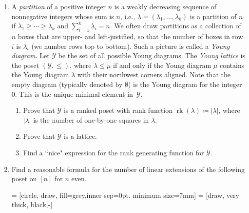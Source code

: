\documentclass[11pt]{article}%
\theoremstyle{definition}
\DeclareMathOperator{\rk}{rk}
\begin{document}
\begin{enumerate}

\item A \emph{partition} of a positive integer $n$ is a weakly decreasing sequence of nonnegative integers whose sum is $n$, i.e., $\lambda = (\lambda_1,\ldots,\lambda_k)$ is a partition of $n$ if $\lambda_1\geq\cdots\geq \lambda_k$ and $\sum_{i=1}^k \lambda_i = n$. We often draw partitions as a collection of $n$ boxes that are upper- and left-justified, so that the number of boxes in row $i$ is $\lambda_i$ (we number rows top to bottom). Such a picture is called a \emph{Young diagram}. Let $\mathcal{Y}$ be the set of all possible Young diagrams. The \emph{Young lattice} is the poset $(\mathcal{Y},\leq)$, where $\lambda\leq \mu$ if and only if the Young diagram $\mu$ contains the Young diagram $\lambda$ with their northwest corners aligned. Note that the empty diagram (typically denoted by $\emptyset$) is the Young diagram for the integer 0. This is the unique minimal element in~$\mathcal{Y}$.
\begin{enumerate}
\item Prove that $\mathcal{Y}$ is a ranked poset with rank function $\rk(\lambda)\coloneqq |\lambda|$, where $|\lambda|$ is the number of one-by-one squares in $\lambda$.
\item Prove that $\mathcal{Y}$ is a lattice.
\item Find a ``nice" expression for the rank generating function for $\mathcal{Y}$.
\end{enumerate} 

\item Find a reasonable formula for the number of linear extensions of the following poset on $[n]$ for $n$ even.

 = [circle, draw, fill=grey,inner sep=0pt, minimum size=7mm]
 = [draw, very thick, black,-]

\begin{center}
\end{center}


\end{enumerate}
\end{document}
